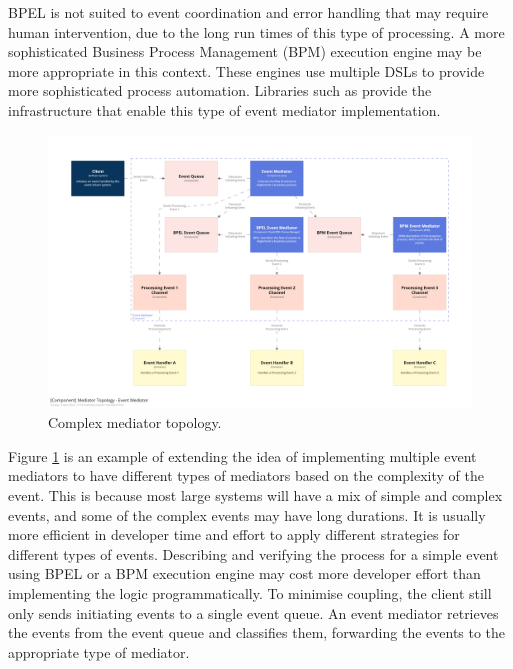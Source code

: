 BPEL is not suited to event coordination and error handling that may require human intervention, due to the long run times of this type of processing.
A more sophisticated Business Process Management (BPM) execution engine may be more appropriate in this context.
These engines use multiple DSLs to provide more sophisticated process automation.
Libraries such as  provide the infrastructure that enable this type of event mediator implementation.

\begin{figure}[h!]
    \begin{adjustwidth}{-10mm}{-10mm}
        \centering
        \includegraphics[trim=195 195 195 195,clip,width=0.97\paperwidth]{diagrams/complex-mediator-components.png}
    \end{adjustwidth}
    \caption{Complex mediator topology.}
    \label{fig:complex-mediator-components}
\end{figure}

Figure \ref{fig:complex-mediator-components} is an example of extending the idea of implementing multiple event mediators
to have different types of mediators based on the complexity of the event.
This is because most large systems will have a mix of simple and complex events, and some of the complex events may have long durations.
It is usually more efficient in developer time and effort to apply different strategies for different types of events.
Describing and verifying the process for a simple event using BPEL or a BPM execution engine
may cost more developer effort than implementing the logic programmatically.
To minimise coupling, the client still only sends initiating events to a single event queue.
An event mediator retrieves the events from the event queue and classifies them, forwarding the events to the appropriate type of mediator.


